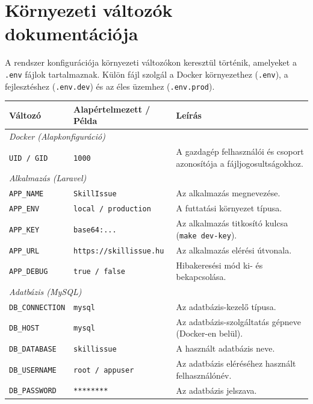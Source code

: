 \chapter{Környezeti változók dokumentációja}
\label{ch:envvar}

A rendszer konfigurációja környezeti változókon keresztül történik, amelyeket a \texttt{.env} fájlok tartalmaznak. Külön fájl szolgál a Docker környezethez (\texttt{.env}), a fejlesztéshez (\texttt{.env.dev}) és az éles üzemhez (\texttt{.env.prod}).

\begin{table}[h!]
    \centering
    \small
    \renewcommand{\arraystretch}{1.3}
    \begin{tabularx}{\textwidth}{|l|X|X|}
        \hline
        \rowcolor[HTML]{EFEFEF} 
        \textbf{Változó} & \textbf{Alapértelmezett / Példa} & \textbf{Leírás} \\ \hline
        
        \multicolumn{3}{|l|}{\cellcolor[HTML]{F5F5F5}\textit{Docker (Alapkonfiguráció)}} \\ \hline
        \texttt{UID / GID} & \texttt{1000} & A gazdagép felhasználói és csoport azonosítója a fájljogosultságokhoz. \\ \hline
        
        \multicolumn{3}{|l|}{\cellcolor[HTML]{F5F5F5}\textit{Alkalmazás (Laravel)}} \\ \hline
        \texttt{APP\_NAME} & \texttt{SkillIssue} & Az alkalmazás megnevezése. \\ \hline
        \texttt{APP\_ENV} & \texttt{local / production} & A futtatási környezet típusa. \\ \hline
        \texttt{APP\_KEY} & \texttt{base64:...} & Az alkalmazás titkosító kulcsa (\texttt{make dev-key}). \\ \hline
        \texttt{APP\_URL} & \texttt{https://skillissue.hu} & Az alkalmazás elérési útvonala. \\ \hline
        \texttt{APP\_DEBUG} & \texttt{true / false} & Hibakeresési mód ki- és bekapcsolása. \\ \hline
        
        \multicolumn{3}{|l|}{\cellcolor[HTML]{F5F5F5}\textit{Adatbázis (MySQL)}} \\ \hline
        \texttt{DB\_CONNECTION} & \texttt{mysql} & Az adatbázis-kezelő típusa. \\ \hline
        \texttt{DB\_HOST} & \texttt{mysql} & Az adatbázis-szolgáltatás gépneve (Docker-en belül). \\ \hline
        \texttt{DB\_DATABASE} & \texttt{skillissue} & A használt adatbázis neve. \\ \hline
        \texttt{DB\_USERNAME} & \texttt{root / appuser} & Az adatbázis eléréséhez használt felhasználónév. \\ \hline
        \texttt{DB\_PASSWORD} & \texttt{********} & Az adatbázis jelszava. \\ \hline
        

\end{tabularx}
\end{table}
